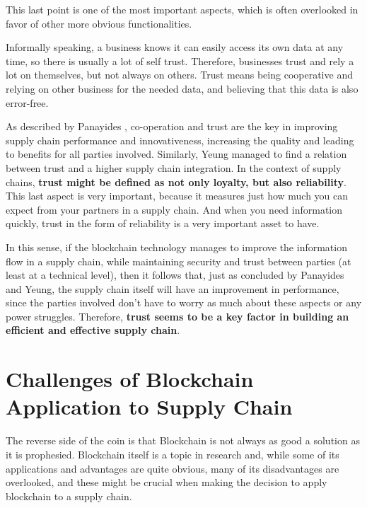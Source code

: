
This last point is one of the most important aspects, which is often overlooked in favor of other more obvious functionalities.

Informally speaking, a business knows it can easily access its own data at any time, so there is usually a lot of self trust. Therefore, businesses trust and rely a lot on themselves, but not always on others. Trust means being cooperative and relying on other business for the needed data, and believing that this data is also error-free. 

As described by Panayides \cite{Panayides2009}, co-operation and trust are the key in improving supply chain performance and innovativeness, increasing the quality and leading to benefits for all parties involved. Similarly, Yeung \cite{Yeung2009} managed to find a relation between trust and a higher supply chain integration. In the context of supply chains, \textbf{trust might be defined as not only loyalty, but also reliability}. This last aspect is very important, because it measures just how much you can expect from your partners in a supply chain. And when you need information quickly, trust in the form of reliability is a very important asset to have.

In this sense, if the blockchain technology manages to improve the information flow in a supply chain, while maintaining security and trust between parties (at least at a technical level), then it follows that, just as concluded by Panayides and Yeung, the supply chain itself will have an improvement in performance, since the parties involved don't have to worry as much about these aspects or any power struggles. Therefore, \textbf{trust seems to be a key factor in building an efficient and effective supply chain}.

\section{Challenges of Blockchain Application to Supply Chain}

The reverse side of the coin is that Blockchain is not always as good a solution as it is prophesied. Blockchain itself is a topic in research and, while some of its applications and advantages are quite obvious, many of its disadvantages are overlooked, and these might be crucial when making the decision to apply blockchain to a supply chain.

